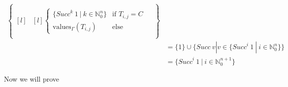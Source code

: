 \documentclass[]{scrbook}
\theoremstyle{definition}
\theoremstyle{definition}
\theoremstyle{definition}
\theoremstyle{remark}
\begin{document}
\begin{addmargin}[1cm]{0cm}
$$\begin{aligned}
\begin{Bmatrix*}[l]
\begin{array}{l|l}
\begin{matrix*}[l]
        \begin{cases}
          \{\mathit{Succ}^k \ 1\ |\ k\in\mathbb{N}^n_0\}&\text{if } T_{i,j} = C\\
          \mathrm{values}_\Gamma(T_{i,j})&\text{else}
        \end{cases}
        \end{matrix*}
    \end{array}
  \end{Bmatrix*}\\
&=\{1\}\cup\{\mathit{Succ}\ v | v \in \{\mathit{Succ}^i \ 1\ |\ i\in\mathbb{N}^n_0\}\}\\
&=\{\mathit{Succ}^i \ 1\ |\ i\in\mathbb{N}^{n+1}_0\}
\end{aligned}
$$
\end{addmargin}

Now we will prove
\end{document}
